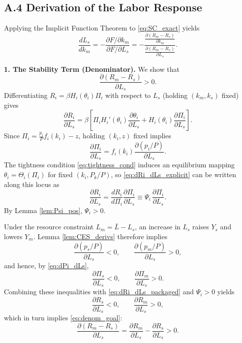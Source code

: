 \documentclass[12pt]{article} %
\theoremstyle{remark}
\begin{document}
\subsection*{A.4 Derivation of the Labor Response}\label{app:GE_L_deriv}

Applying the Implicit Function Theorem to \eqref{eq:SC_exact} yields
\begin{equation}\label{eq:IFT_master}
\frac{dL_s}{dk_m}
= - \frac{\partial F / \partial k_m}{\partial F / \partial L_s}
= - \frac{\frac{\partial (R_m - R_s)}{\partial k_m}}{\frac{\partial (R_m - R_s)}{\partial L_s}}.
\end{equation}

\noindent\textbf{1. The Stability Term (Denominator).}
We show that
\begin{equation}\label{eq:denom_goal}
\frac{\partial (R_m-R_s)}{\partial L_s} > 0 .
\end{equation}
Differentiating $R_i=\beta H_i(\theta_i)\Pi_i$ with respect to $L_s$ (holding $(k_m,k_s)$ fixed) gives
\begin{equation}\label{eq:dRi_dLs_explicit}
\frac{\partial R_i}{\partial L_s}
=\beta\left[\Pi_i H_i'(\theta_i)\frac{\partial \theta_i}{\partial L_s}
+H_i(\theta_i)\frac{\partial \Pi_i}{\partial L_s}\right].
\end{equation}
Since $\Pi_i=\frac{p_i}{P}f_i(k_i)-z$, holding $(k_i,z)$ fixed implies
\begin{equation}\label{eq:dPi_dLs}
\frac{\partial \Pi_i}{\partial L_s}=f_i(k_i)\frac{\partial (p_i/P)}{\partial L_s}.
\end{equation}
The tightness condition \eqref{eq:tightness_cond} induces an equilibrium mapping $\theta_i=\Theta_i(\Pi_i)$ for fixed $(k_i,P_k/P)$, so \eqref{eq:dRi_dLs_explicit} can be written along this locus as
\begin{equation}\label{eq:dRi_dLs_packaged}
\frac{\partial R_i}{\partial L_s}
=\frac{dR_i}{d\Pi_i}\frac{\partial \Pi_i}{\partial L_s}
\equiv \Psi_i\,\frac{\partial \Pi_i}{\partial L_s}.
\end{equation}
By Lemma \ref{lem:Psi_pos}, $\Psi_i>0$.

Under the resource constraint $L_m=\bar L-L_s$, an increase in $L_s$ raises $Y_s$ and lowers $Y_m$. Lemma \ref{lem:CES_derivs} therefore implies
\[
\frac{\partial (p_s/P)}{\partial L_s}<0,
\qquad
\frac{\partial (p_m/P)}{\partial L_s}>0,
\]
and hence, by \eqref{eq:dPi_dLs},
\[
\frac{\partial \Pi_s}{\partial L_s}<0,
\qquad
\frac{\partial \Pi_m}{\partial L_s}>0.
\]
Combining these inequalities with \eqref{eq:dRi_dLs_packaged} and $\Psi_i>0$ yields
\[
\frac{\partial R_s}{\partial L_s}<0,
\qquad
\frac{\partial R_m}{\partial L_s}>0,
\]
which in turn implies \eqref{eq:denom_goal}:
\[
\frac{\partial (R_m-R_s)}{\partial L_s}
=\frac{\partial R_m}{\partial L_s}-\frac{\partial R_s}{\partial L_s}
>0.
\]
\end{document}
